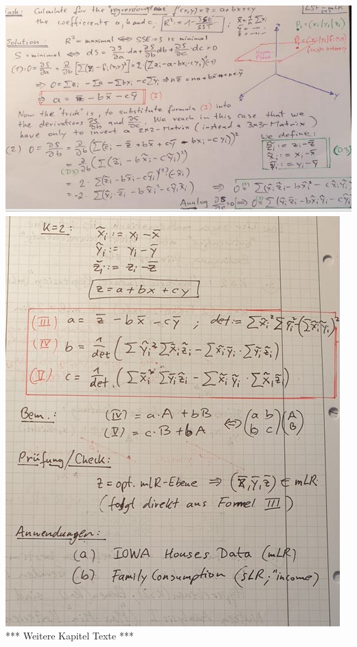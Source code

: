 \documentclass[12pt]{article}
\begin{document}
\includegraphics{LSF-mLR(k=2)-1}\\
\includegraphics{LSF-mLR(k=2)-2}\\


*** Weitere Kapitel Texte ***
\end{document}
